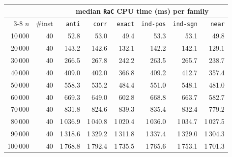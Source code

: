 \begin{tabular}{@{}rrrrrrrr@{}}
\toprule
 &  & \multicolumn{6}{c}{median \texttt{RaC} CPU time (ms) per family} \\
\cmidrule(l){3-8}
$n$ & \#inst & \texttt{anti} & \texttt{corr} & \texttt{exact} & \texttt{ind-pos} & \texttt{ind-sgn} & \texttt{near} \\
\midrule
10\,000 & 40 & 52.8 & 53.0 & 49.4 & 53.3 & 53.1 & 49.8 \\
20\,000 & 40 & 143.2 & 142.6 & 132.1 & 142.2 & 142.1 & 129.1 \\
30\,000 & 40 & 266.5 & 267.8 & 242.2 & 263.5 & 265.7 & 238.7 \\
40\,000 & 40 & 409.0 & 402.0 & 366.8 & 409.2 & 412.7 & 357.4 \\
50\,000 & 40 & 558.3 & 535.2 & 484.4 & 551.0 & 548.1 & 481.0 \\
60\,000 & 40 & 669.3 & 649.0 & 602.8 & 668.8 & 663.7 & 582.7 \\
70\,000 & 40 & 831.8 & 824.6 & 839.3 & 835.4 & 832.4 & 779.2 \\
80\,000 & 40 & 1\,036.9 & 1\,040.8 & 1\,020.4 & 1\,036.0 & 1\,034.7 & 1\,027.5 \\
90\,000 & 40 & 1\,318.6 & 1\,329.2 & 1\,311.8 & 1\,337.4 & 1\,329.0 & 1\,304.3 \\
100\,000 & 40 & 1\,768.8 & 1\,792.4 & 1\,735.5 & 1\,765.6 & 1\,753.1 & 1\,701.3 \\
\bottomrule
\end{tabular}
